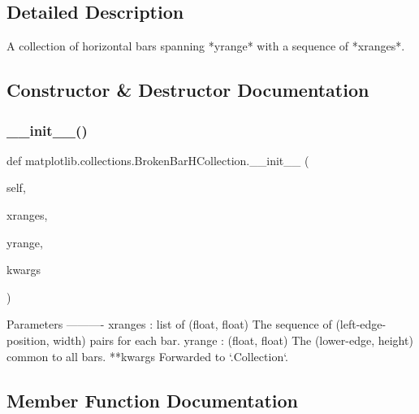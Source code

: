 \subsection{Detailed Description}
\begin{DoxyVerb}A collection of horizontal bars spanning *yrange* with a sequence of
*xranges*.
\end{DoxyVerb}
 

\subsection{Constructor \& Destructor Documentation}
\mbox{\label{classmatplotlib_1_1collections_1_1BrokenBarHCollection_aa16b39a70084a828f3fe050d6ee1b036}} 
\subsubsection{\texorpdfstring{\+\_\+\+\_\+init\+\_\+\+\_\+()}{\_\_init\_\_()}}
{\footnotesize\ttfamily def matplotlib.\+collections.\+Broken\+Bar\+H\+Collection.\+\_\+\+\_\+init\+\_\+\+\_\+ (\begin{DoxyParamCaption}\item[{}]{self,  }\item[{}]{xranges,  }\item[{}]{yrange,  }\item[{}]{kwargs }\end{DoxyParamCaption})}

\begin{DoxyVerb}Parameters
----------
xranges : list of (float, float)
    The sequence of (left-edge-position, width) pairs for each bar.
yrange : (float, float)
    The (lower-edge, height) common to all bars.
**kwargs
    Forwarded to `.Collection`.
\end{DoxyVerb}
 

\subsection{Member Function Documentation}
\mbox{\label{classmatplotlib_1_1collections_1_1BrokenBarHCollection_a92fcd6cdf07fed876f84698f93c2d7ac}} 
